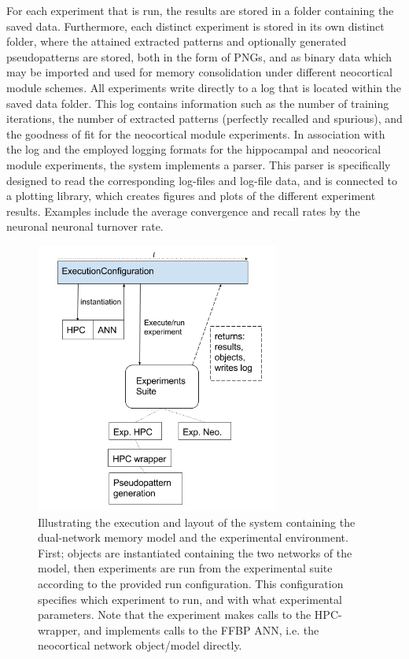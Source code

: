 For each experiment that is run, the results are stored in a folder containing the saved data. Furthermore, each distinct experiment is stored in its own distinct folder, where the attained extracted patterns and optionally generated pseudopatterns are stored, both in the form of PNGs, and as binary data which may be imported and used for memory consolidation under different neocortical module schemes. 
All experiments write directly to a log that is located within the saved data folder. This log contains information such as the number of training iterations, the number of extracted patterns (perfectly recalled and spurious), and the goodness of fit for the neocortical module experiments. 
In association with the log and the employed logging formats for the hippocampal and neocorical module experiments, the system implements a parser. This parser is specifically designed to read the corresponding log-files and log-file data, and is connected to a plotting library, which creates figures and plots of the different experiment results. Examples include the average convergence and recall rates by the neuronal neuronal turnover rate.

\begin{figure}
    \centering
    \includegraphics[width=8cm]{fig/ExecutionConfiguration.png}
    \caption{Illustrating the execution and layout of the system containing the dual-network memory model and the experimental environment. First; objects are instantiated containing the two networks of the model, then experiments are run from the experimental suite according to the provided run configuration. This configuration specifies which experiment to run, and with what experimental parameters. Note that the experiment makes calls to the HPC-wrapper, and implements calls to the FFBP ANN, i.e. the neocortical network object/model directly.}
    \label{fig:system_layout}
\end{figure}

